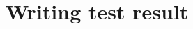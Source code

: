 \hypertarget{group___writing_test_result}{
\section{Writing test result}
\label{group___writing_test_result}
}
